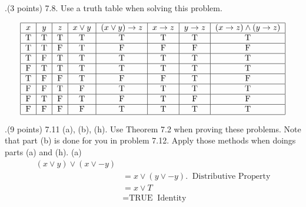 \documentclass[12pt]{article}
\begin{document}
.(3 points) 7.8.  Use a truth table when solving this problem. 
\vspace{.15in}

\[ %
\begin{tabular}{|c|c|c|c|c|c|c|c|} 
\hline %
$x$ & $y$ & $z$ & $x \vee y$ & $(x \vee y) \rightarrow z$ & $x\rightarrow z$ & $y \rightarrow z$ & $(x \rightarrow z) \wedge (y \rightarrow z)$ \\ 
\hline
T&T&T&T&T&T&T&T \\
\hline
T&T&F&T&F&F&F&F \\
\hline 
T&F&T&T&T&T&T&T \\
\hline
F&T&T&T&T&T&T&T \\
\hline
T&F&F&T&F&F&T&F \\
\hline
F&F&T&F&T&T&T&T \\
\hline 
F&T&F&T&F&T&F&F \\
\hline
F&F&F&F&T&T&T&T \\
\hline

\end{tabular} %
\] 
\vspace{0.5in}



.(9 points) 7.11 (a), (b), (h).  Use Theorem 7.2 when proving these problems.  Note that part (b) is done for you in problem 7.12.  Apply those methods when doings parts (a) and (h).  
\newline
\vspace{.15in}
(a)  \[
\begin{aligned} 
(x \vee y) \vee (x \vee -y) \\
&= x \vee (y \vee -y).  \;\;  \mbox{Distributive Property} \\ %
&= x \vee T  \\
&= \mbox{TRUE} \;\; \mbox{Identity} \\
\end{aligned}
\]
\end{document}
